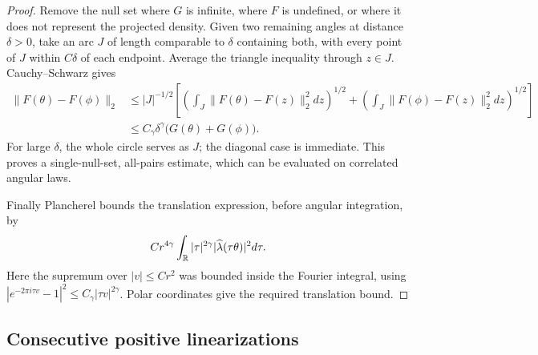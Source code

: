 \begin{proof}
Remove the null set where \(G\) is infinite, where \(F\) is undefined, or where it does not represent the projected density. Given two remaining angles at distance \(\delta>0\), take an arc \(J\) of length comparable to \(\delta\) containing both, with every point of \(J\) within \(C\delta\) of each endpoint. Average the triangle inequality through \(z\in J\). Cauchy--Schwarz gives
$$
\begin{aligned}
\|F(\theta)-F(\phi)\|_2
&\leq |J|^{-1/2}
\left[\left(\int_J\|F(\theta)-F(z)\|_2^2dz\right)^{1/2}
+\left(\int_J\|F(\phi)-F(z)\|_2^2dz\right)^{1/2}\right]\\
&\leq C_\gamma\delta^\gamma\bigl(G(\theta)+G(\phi)\bigr).
\end{aligned}
$$
For large \(\delta\), the whole circle serves as \(J\); the diagonal case is immediate. This proves a single-null-set, all-pairs estimate, which can be evaluated on correlated angular laws.

Finally Plancherel bounds the translation expression, before angular integration, by
$$
Cr^{4\gamma}\int_\mathbb R |\tau|^{2\gamma}|\widehat\lambda(\tau\theta)|^2d\tau.
$$
Here the supremum over \(|v|\leq Cr^2\) was bounded inside the Fourier integral, using \(|e^{-2\pi i\tau v}-1|^2\leq C_\gamma|\tau v|^{2\gamma}\). Polar coordinates give the required translation bound.
\end{proof}

\subsection{Consecutive positive linearizations}

